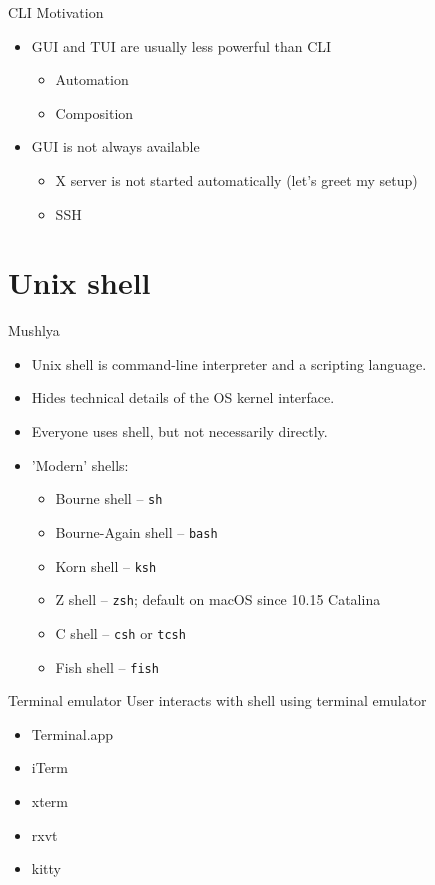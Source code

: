 \documentclass[presentation,aspectratio=169,smaller]{beamer}
\begin{document}
\begin{frame}[label={sec:orga8d10ce}]{CLI Motivation}
\begin{itemize}
\item GUI and TUI are usually less powerful than CLI
\begin{itemize}
\item Automation
\item Composition
\end{itemize}
\item GUI is not always available
\begin{itemize}
\item X server is not started automatically (let’s greet my setup)
\item SSH
\end{itemize}
\end{itemize}
\end{frame}

\section{Unix shell}
\label{sec:orgf73c368}

\begin{frame}[label={sec:orgaccff8d},fragile]{Mushlya}
 \begin{itemize}
\item Unix shell is command-line interpreter and a scripting language.
\item Hides technical details of the OS kernel interface.
\item Everyone uses shell, but not necessarily directly.
\item 'Modern' shells:
\begin{itemize}
\item Bourne shell -- \texttt{sh}
\item Bourne-Again shell -- \texttt{bash}
\item Korn shell -- \texttt{ksh}
\item Z shell -- \texttt{zsh}; default on macOS since 10.15 Catalina
\item C shell -- \texttt{csh} or \texttt{tcsh}
\item Fish shell -- \texttt{fish}
\end{itemize}
\end{itemize}
\end{frame}

\begin{frame}[label={sec:orgd7e2775}]{Terminal emulator}
User interacts with shell using terminal emulator

\begin{itemize}
\item Terminal.app
\item iTerm
\item xterm
\item rxvt
\item kitty
\end{itemize}
\end{frame}
\end{document}
